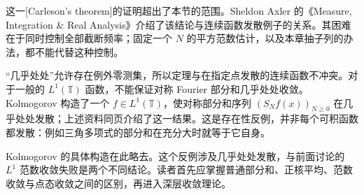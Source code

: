 这一[Carleson's theorem]的证明超出了本节的范围。Sheldon Axler 的《Measure, Integration \& Real Analysis》\cite[p. 352, Section 11A]{Axler2020Measure}介绍了该结论与连续函数发散例子的关系。其困难在于同时控制全部截断频率；固定一个 \(N\) 的平方范数估计，以及本章抽子列的办法，都不能代替这种控制。

\ProseParagraphBreak

“几乎处处”允许存在例外零测集，所以定理与在指定点发散的连续函数不冲突。对于一般的 \(L^1(\mathbb T)\) 函数，不能保证对称 Fourier 部分和几乎处处收敛。Kolmogorov 构造了一个 \(f\in L^1(\mathbb T)\)，使对称部分和序列 \((S_Nf(x))_{N\geq0}\) 在几乎处处发散；上述资料同页介绍了这一结果。这是存在性反例，并非每个可积函数都发散：例如三角多项式的部分和在充分大时就等于它自身。

\ProseParagraphBreak

Kolmogorov 的具体构造在此略去。这个反例涉及几乎处处发散，与前面讨论的 \(L^1\) 范数收敛失败是两个不同结论。读者首先应掌握普通部分和、正核平均、范数收敛与点态收敛之间的区别，再进入深层收敛理论。
